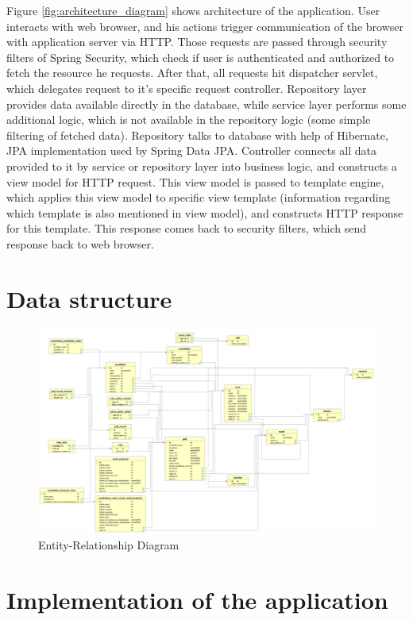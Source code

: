\documentclass[a4paper,twoside,12pt]{book}
\begin{document}
    Figure \ref{fig:architecture_diagram} shows architecture of the application. 
    User interacts with web browser, and his actions trigger communication of the browser with application server via HTTP.
    Those requests are passed through security filters of Spring Security, which check if user is authenticated and authorized to fetch the resource he requests.
    After that, all requests hit dispatcher servlet, which delegates request to it's specific request controller.
    Repository layer provides data available directly in the database, 
    while service layer performs some additional logic, which is not available in the repository logic (some simple filtering of fetched data).
    Repository talks to database with help of Hibernate, JPA implementation used by Spring Data JPA. 
    Controller connects all data provided to it by service or repository layer into business logic, and constructs a view model for HTTP request.
    This view model is passed to template engine, 
    which applies this view model to specific view template (information regarding which template is also mentioned in view model), 
    and constructs HTTP response for this template.
    This response comes back to security filters, which send response back to web browser.
    \pagebreak

  \section{Data structure}
    \begin{figure}[h]
      \includegraphics[width=\linewidth]{erd.png}
      \caption{Entity-Relationship Diagram}
      \label{fig:erd}
    \end{figure}

  \section{Implementation of the application}
\end{document}
